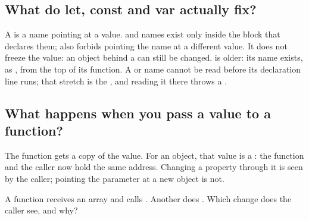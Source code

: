 \subsection{What do let, const and var actually fix?}%
A  is a name pointing at a value.  and  names exist only inside the block  that declares them;  also forbids pointing the name at a different value. It does not freeze the value: an object behind a  can still be changed.
 is older: its name exists, as , from the top of its function. A  or  name cannot be read before its declaration line runs; that stretch is the , and reading it there throws a .

\subsection{What happens when you pass a value to a function?}%
The function gets a copy of the value. For an object, that value is a : the function and the caller now hold the same address. Changing a property through it is seen by the caller; pointing the parameter at a new object is not.

\begin{ponder}A function receives an array and calls . Another does . Which change does the caller see, and why?\end{ponder}
